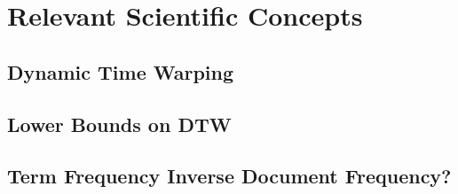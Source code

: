 %

\section{{Relevant Scientific Concepts}}
\subsection{Dynamic Time Warping}
\subsection{Lower Bounds on DTW}
\subsection{Term Frequency Inverse Document Frequency?}



